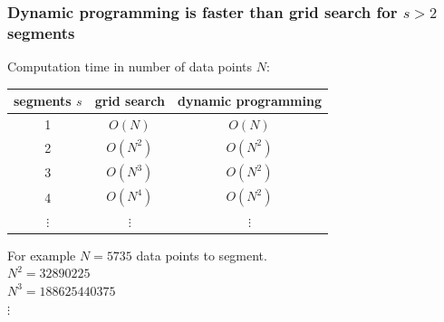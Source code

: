 \documentclass{beamer}
\begin{document}
\begin{frame}
  \frametitle{Dynamic programming is faster than grid search for $s>
    2$ segments}

  Computation time in number of data points $N$:

  \vskip 1cm

  \begin{tabular}{ccc}
    segments $s$ & grid search & dynamic programming \\
    \hline
    1 & $O(N)$ & $O(N)$ \\
    2 & $O(N^2)$ & $O(N^2)$ \\
    3 & $O(N^3)$ & $O(N^2)$ \\
    4 & $O(N^4)$ & $O(N^2)$ \\
    $\vdots$ &     $\vdots$ &     $\vdots$ 
  \end{tabular}

  \vskip 1cm

  For example $N = 5735$ data points to segment.\\
  $N^2 = 32890225$\\
  $N^3 = 188625440375$\\
  $\vdots$
\end{frame}


\end{document}
